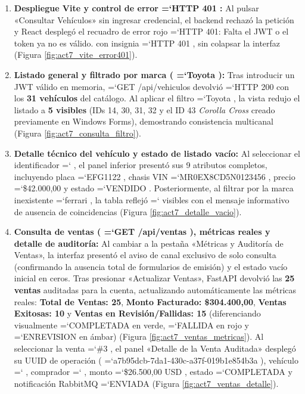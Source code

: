 \documentclass[11pt,a4paper]{article}
\renewcommand{\_}{\oldunderscore\allowbreak}
\DeclareRobustCommand{\texttt}[1]{%
  {\upshape\ttfamily\fontsize{9}{10.8}\selectfont\hyphenchar\font=`\-\relax #1}%
}
\begin{document}
\begin{enumerate}[leftmargin=*,itemsep=3pt,topsep=2pt]
  \item \textbf{Despliegue Vite y control de error \texttt{HTTP 401}:} Al pulsar «Consultar Vehículos» sin ingresar credencial, el backend rechazó la petición y React desplegó el recuadro de error rojo \texttt{HTTP 401: Falta el JWT o el token ya no es válido.} con insignia \texttt{HTTP 401}, sin colapsar la interfaz (Figura \ref{fig:act7_vite_error401}).
  \item \textbf{Listado general y filtrado por marca (\texttt{Toyota}):} Tras introducir un JWT válido en memoria, \texttt{GET /\allowbreak{}api/\allowbreak{}vehiculos} devolvió \texttt{HTTP 200} con los \textbf{31 vehículos} del catálogo. Al aplicar el filtro \texttt{Toyota}, la vista redujo el listado a \textbf{5 visibles} (IDs 14, 30, 31, 32 y el ID 43 \textit{Corolla Cross} creado previamente en Windows Forms), demostrando consistencia multicanal (Figura \ref{fig:act7_consulta_filtro}).
  \item \textbf{Detalle técnico del vehículo y estado de listado vacío:} Al seleccionar el identificador \texttt{14}, el panel inferior presentó sus 9 atributos completos, incluyendo placa \texttt{EFG1122}, chasis VIN \texttt{MR0EX8CD5N0123456}, precio \texttt{\$42.000,00} y estado \texttt{VENDIDO}. Posteriormente, al filtrar por la marca inexistente \texttt{ferrari}, la tabla reflejó \texttt{0 visibles} con el mensaje informativo de ausencia de coincidencias (Figura \ref{fig:act7_detalle_vacio}).
  \item \textbf{Consulta de ventas (\texttt{GET /\allowbreak{}api/\allowbreak{}ventas}), métricas reales y detalle de auditoría:} Al cambiar a la pestaña «Métricas y Auditoría de Ventas», la interfaz presentó el aviso de canal exclusivo de solo consulta (confirmando la ausencia total de formularios de emisión) y el estado vacío inicial en ceros. Tras presionar «Actualizar Ventas», FastAPI devolvió las \textbf{25 ventas} auditadas para la cuenta, actualizando automáticamente las métricas reales: \textbf{Total de Ventas: 25}, \textbf{Monto Facturado: \$304.400,00}, \textbf{Ventas Exitosas: 10} y \textbf{Ventas en Revisión/Fallidas: 15} (diferenciando visualmente \texttt{COMPLETADA} en verde, \texttt{FALLIDA} en rojo y \texttt{EN\_REVISION} en ámbar) (Figura \ref{fig:act7_ventas_metricas}). Al seleccionar la venta \texttt{\#3}, el panel «Detalle de la Venta Auditada» desplegó su UUID de operación (\texttt{a7b95dcb-7da1-430c-a37f-019b1e854b3a}), vehículo \texttt{12}, comprador \texttt{2}, monto \texttt{\$26.\allowbreak{}500,\allowbreak{}00 USD}, estado \texttt{COMPLETADA} y notificación RabbitMQ \texttt{ENVIADA} (Figura \ref{fig:act7_ventas_detalle}).

\end{enumerate}
\end{document}
